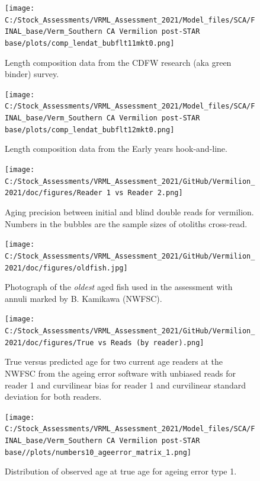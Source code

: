 \documentclass[
  english,
  a4paper,
]{article}
\begin{document}
\begin{figure}
\centering
\texttt{[image: C:/Stock\_Assessments/VRML\_Assessment\_2021/Model\_files/SCA/FINAL\_base/Verm\_Southern CA Vermilion post-STAR base/plots/comp\_lendat\_bubflt11mkt0.png]}
\caption{Length composition data from the CDFW research (aka green binder) survey.\label{fig:len-data-CDFW-RESEARCH}}
\end{figure}

\begin{figure}
\centering
\texttt{[image: C:/Stock\_Assessments/VRML\_Assessment\_2021/Model\_files/SCA/FINAL\_base/Verm\_Southern CA Vermilion post-STAR base/plots/comp\_lendat\_bubflt12mkt0.png]}
\caption{Length composition data from the Early years hook-and-line.\label{fig:len-data-EARLY-HKL}}
\end{figure}

\begin{figure}
\centering
\texttt{[image: C:/Stock\_Assessments/VRML\_Assessment\_2021/GitHub/Vermilion\_2021/doc/figures/Reader 1 vs Reader 2.png]}
\caption{Aging precision between initial and blind double reads for vermilion.
Numbers in the bubbles are the sample sizes of otoliths cross-read.\label{fig:reader1reader2}}
\end{figure}

\begin{figure}
\centering
\texttt{[image: C:/Stock\_Assessments/VRML\_Assessment\_2021/GitHub/Vermilion\_2021/doc/figures/oldfish.jpg]}
\caption{Photograph of the \emph{oldest} aged fish used in the assessment with annuli marked by B. Kamikawa (NWFSC).\label{fig:oldfish}}
\end{figure}

\begin{figure}
\centering
\texttt{[image: C:/Stock\_Assessments/VRML\_Assessment\_2021/GitHub/Vermilion\_2021/doc/figures/True vs Reads (by reader).png]}
\caption{True versus predicted age for two current age readers at the NWFSC
from the ageing error software with unbiased reads for reader 1 and curvilinear
bias for reader 1 and curvilinear standard deviation for both readers.\label{fig:truereads}}
\end{figure}

\begin{figure}
\centering
\texttt{[image: C:/Stock\_Assessments/VRML\_Assessment\_2021/Model\_files/SCA/FINAL\_base/Verm\_Southern CA Vermilion post-STAR base//plots/numbers10\_ageerror\_matrix\_1.png]}
\caption{Distribution of observed age at true age for ageing error type 1.\label{fig:ageerror}}
\end{figure}
\end{document}
